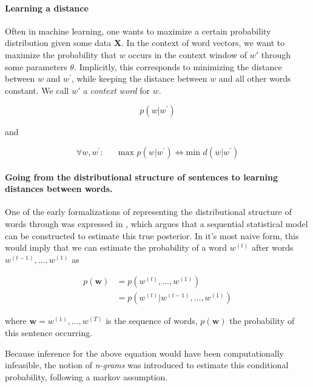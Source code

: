 \documentclass[a4paper,12pt,twoside,openright]{report}
\begin{document}
\paragraph{Learning a distance}
Often in machine learning, one wants to maximize a certain probability distribution given some data $\mathbf{X}$.
In the context of word vectors, we want to maximize the probability that $w$ occurs in the context window of $w \prime$ through some parameters $\theta$.
Implicitly, this corresponds to minimizing the distance between $w$ and $w^{\prime}$, while keeping the distance between $w$ and all other words constant. 
We call $w \prime$ a \textit{context word} for $w$.

\begin{equation}
p \left(w | w^{\prime}\right)
\end{equation}

and 

\begin{equation}
\forall w, w^{\prime} : \hspace{20pt} \text{max } p \left(w | w^{\prime}\right) \iff \text{min } d(w | w^{\prime})
\end{equation}

\paragraph{Going from the distributional structure of sentences to learning distances between words.} One of the early formalizations of representing the distributional structure of words through was expressed in \cite{bengio03}, which argues that a sequential statistical model can be constructed to estimate this true posterior.  
In it's most naive form, this would imply that we can estimate the probability of a word $w^{(t)}$ after words $w^{(t-1)}, \ldots, w^{(1)}$ as

\begin{align}
p(\mathbf{w}) &= p(w^{(t)}, \ldots, w^{(1)}) \\
&= p\left( w^{(t)} | w^{(t -1)}, \ldots, w^{(1)} \right)
\end{align}{\label{eq:naive_sequential_probability}}


where $\mathbf{w} = w^{(1)}, \dots, w^{(T)} $ is the sequence of words, $p(\mathbf{w})$ the probability of this sentence occurring.

Because inference for the above equation would have been computationally infeasible, the notion of \textit{n-grams} was introduced to estimate this conditional probability, following a markov assumption.
\end{document}
